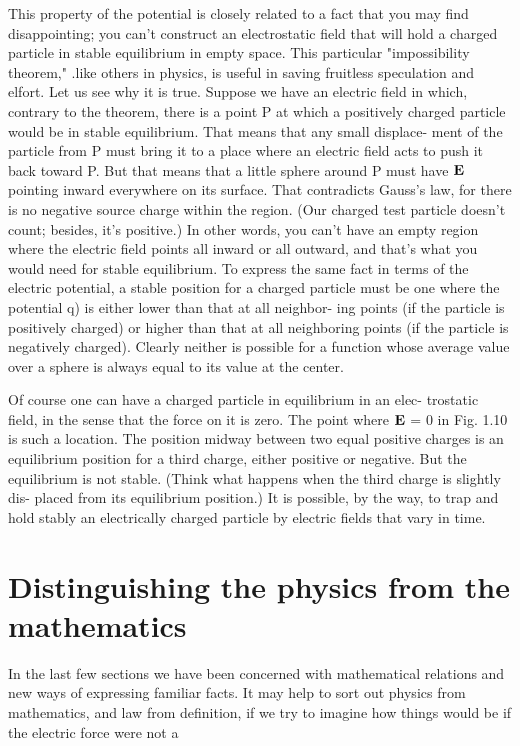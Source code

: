 This property of the potential is closely related to a fact that you
may find disappointing; you can't construct an electrostatic field that
will hold a charged particle in stable equilibrium in empty space.
This particular "impossibility theorem," .like others in physics, is
useful in saving fruitless speculation and elfort. Let us see why it
is true. Suppose we have an electric field in which, contrary to the
theorem, there is a point P at which a positively charged particle
would be in stable equilibrium. That means that any small displace-
ment of the particle from P must bring it to a place where an electric
field acts to push it back toward P. But that means that a little sphere
around P must have $\mathbf{E}$ pointing inward everywhere on its surface.
That contradicts Gauss's law, for there is no negative source charge
within the region. (Our charged test particle doesn't count; besides,
it's positive.) In other words, you can't have an empty region where
the electric field points all inward or all outward, and that's what you
would need for stable equilibrium. To express the same fact in terms
of the electric potential, a stable position for a charged particle must
be one where the potential q) is either lower than that at all neighbor-
ing points (if the particle is positively charged) or higher than that
at all neighboring points (if the particle is negatively charged).
Clearly neither is possible for a function whose average value over a
sphere is always equal to its value at the center.

Of course one can have a charged particle in equilibrium in an elec-
trostatic field, in the sense that the force on it is zero. The point
where $\mathbf{E}$ = 0 in Fig. 1.10 is such a location. The position midway
between two equal positive charges is an equilibrium position for a
third charge, either positive or negative. But the equilibrium is not
stable. (Think what happens when the third charge is slightly dis-
placed from its equilibrium position.) It is possible, by the way,
to trap and hold stably an electrically charged particle by electric
fields that vary in time.

\section{Distinguishing the physics from the mathematics}

In the last few sections we have been concerned with mathematical
relations and new ways of expressing familiar facts. It may help to
sort out physics from mathematics, and law from definition, if we
try to imagine how things would be if the electric force were not a

